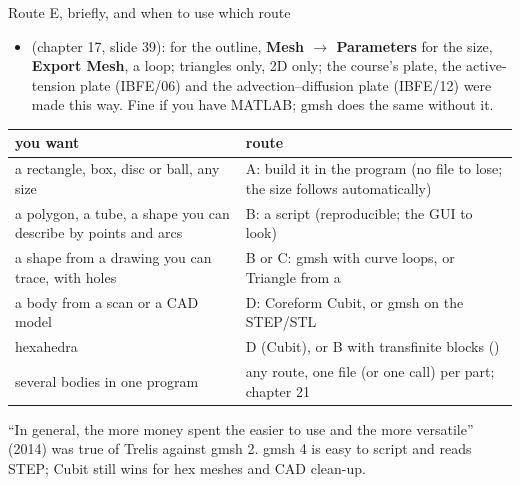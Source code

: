 \documentclass[aspectratio=169,11pt]{beamer}
\begin{document}
\begin{frame}{Route E, briefly, and when to use which route}
\label{fr:which}
\scriptsize
\begin{itemize}
  \item {} (chapter 17, slide 39):  for the outline, \textbf{Mesh $\to$ Parameters} for the size, \textbf{Export Mesh}, a  loop; triangles only, 2D only; the course's plate, the active-tension plate (IBFE/06) and the advection--diffusion plate (IBFE/12) were made this way. Fine if you have MATLAB; gmsh does the same without it.
\end{itemize}
\begin{tabular}{@{}L{0.42\textwidth}L{0.50\textwidth}@{}}
\toprule
you want & route \\
\midrule
a rectangle, box, disc or ball, any size & A: build it in the program (no file to lose; the size follows  automatically) \\
a polygon, a tube, a shape you can describe by points and arcs & B: a  script (reproducible; the GUI to look) \\
a shape from a drawing you can trace, with holes & B or C: gmsh with curve loops, or Triangle from a  \\
a body from a scan or a CAD model & D: Coreform Cubit, or gmsh on the STEP/STL \\
hexahedra & D (Cubit), or B with transfinite blocks () \\
several bodies in one program & any route, one file (or one  call) per part; chapter 21 \\
\bottomrule
\end{tabular}

\begin{punchbox}
\footnotesize ``In general, the more money spent the easier to use and the more versatile'' (2014) was true of Trelis against gmsh 2. gmsh 4 is easy to script and reads STEP; Cubit still wins for hex meshes and CAD clean-up.
\end{punchbox}
\end{frame}
\end{document}
